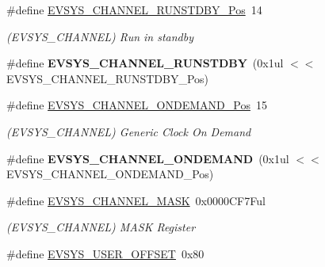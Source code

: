 \begin{DoxyCompactItemize}
\item 
\hypertarget{group___s_a_m_l21___e_v_s_y_s_ga60fc44a6feb69694fa578820a9c13a77}{}\#define \hyperlink{group___s_a_m_l21___e_v_s_y_s_ga60fc44a6feb69694fa578820a9c13a77}{E\+V\+S\+Y\+S\+\_\+\+C\+H\+A\+N\+N\+E\+L\+\_\+\+R\+U\+N\+S\+T\+D\+B\+Y\+\_\+\+Pos}~14\label{group___s_a_m_l21___e_v_s_y_s_ga60fc44a6feb69694fa578820a9c13a77}

\begin{DoxyCompactList}\small\item\em (E\+V\+S\+Y\+S\+\_\+\+C\+H\+A\+N\+N\+E\+L) Run in standby \end{DoxyCompactList}\item 
\hypertarget{group___s_a_m_l21___e_v_s_y_s_gabb1d6e5862446279fc52708fdd41fa8f}{}\#define {\bfseries E\+V\+S\+Y\+S\+\_\+\+C\+H\+A\+N\+N\+E\+L\+\_\+\+R\+U\+N\+S\+T\+D\+B\+Y}~(0x1ul $<$$<$ E\+V\+S\+Y\+S\+\_\+\+C\+H\+A\+N\+N\+E\+L\+\_\+\+R\+U\+N\+S\+T\+D\+B\+Y\+\_\+\+Pos)\label{group___s_a_m_l21___e_v_s_y_s_gabb1d6e5862446279fc52708fdd41fa8f}

\item 
\hypertarget{group___s_a_m_l21___e_v_s_y_s_ga401e9fcb176a21073cd02359cb8ed305}{}\#define \hyperlink{group___s_a_m_l21___e_v_s_y_s_ga401e9fcb176a21073cd02359cb8ed305}{E\+V\+S\+Y\+S\+\_\+\+C\+H\+A\+N\+N\+E\+L\+\_\+\+O\+N\+D\+E\+M\+A\+N\+D\+\_\+\+Pos}~15\label{group___s_a_m_l21___e_v_s_y_s_ga401e9fcb176a21073cd02359cb8ed305}

\begin{DoxyCompactList}\small\item\em (E\+V\+S\+Y\+S\+\_\+\+C\+H\+A\+N\+N\+E\+L) Generic Clock On Demand \end{DoxyCompactList}\item 
\hypertarget{group___s_a_m_l21___e_v_s_y_s_gaf1af0a57dcb602dc60e633dec424a8b6}{}\#define {\bfseries E\+V\+S\+Y\+S\+\_\+\+C\+H\+A\+N\+N\+E\+L\+\_\+\+O\+N\+D\+E\+M\+A\+N\+D}~(0x1ul $<$$<$ E\+V\+S\+Y\+S\+\_\+\+C\+H\+A\+N\+N\+E\+L\+\_\+\+O\+N\+D\+E\+M\+A\+N\+D\+\_\+\+Pos)\label{group___s_a_m_l21___e_v_s_y_s_gaf1af0a57dcb602dc60e633dec424a8b6}

\item 
\hypertarget{group___s_a_m_l21___e_v_s_y_s_gab9faaae565f0d68b4a213473176588bf}{}\#define \hyperlink{group___s_a_m_l21___e_v_s_y_s_gab9faaae565f0d68b4a213473176588bf}{E\+V\+S\+Y\+S\+\_\+\+C\+H\+A\+N\+N\+E\+L\+\_\+\+M\+A\+S\+K}~0x0000\+C\+F7\+Ful\label{group___s_a_m_l21___e_v_s_y_s_gab9faaae565f0d68b4a213473176588bf}

\begin{DoxyCompactList}\small\item\em (E\+V\+S\+Y\+S\+\_\+\+C\+H\+A\+N\+N\+E\+L) M\+A\+S\+K Register \end{DoxyCompactList}\item 
\hypertarget{group___s_a_m_l21___e_v_s_y_s_ga43110f222057e1543486fc474450131c}{}\#define \hyperlink{group___s_a_m_l21___e_v_s_y_s_ga43110f222057e1543486fc474450131c}{E\+V\+S\+Y\+S\+\_\+\+U\+S\+E\+R\+\_\+\+O\+F\+F\+S\+E\+T}~0x80\label{group___s_a_m_l21___e_v_s_y_s_ga43110f222057e1543486fc474450131c}


\end{DoxyCompactItemize}
